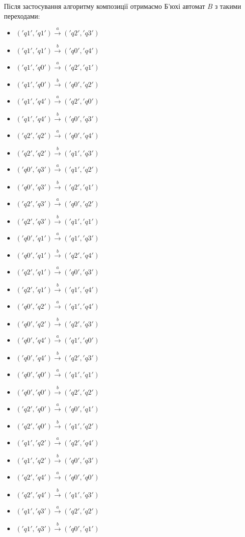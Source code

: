 \documentclass[12pt,a4paper]{article}
\begin{document}
Після застосування алгоритму композиції отримаємо Б'юхі автомат \(B\) з такими переходами:
\begin{itemize}
    \item \(('q1', 'q1') \xrightarrow{a} ('q2', 'q3')\)
    \item \(('q1', 'q1') \xrightarrow{b} ('q0', 'q4')\)
    \item \(('q1', 'q0') \xrightarrow{a} ('q2', 'q1')\)
    \item \(('q1', 'q0') \xrightarrow{b} ('q0', 'q2')\)
    \item \(('q1', 'q4') \xrightarrow{a} ('q2', 'q0')\)
    \item \(('q1', 'q4') \xrightarrow{b} ('q0', 'q3')\)
    \item \(('q2', 'q2') \xrightarrow{a} ('q0', 'q4')\)
    \item \(('q2', 'q2') \xrightarrow{b} ('q1', 'q3')\)
    \item \(('q0', 'q3') \xrightarrow{a} ('q1', 'q2')\)
    \item \(('q0', 'q3') \xrightarrow{b} ('q2', 'q1')\)
    \item \(('q2', 'q3') \xrightarrow{a} ('q0', 'q2')\)
    \item \(('q2', 'q3') \xrightarrow{b} ('q1', 'q1')\)
    \item \(('q0', 'q1') \xrightarrow{a} ('q1', 'q3')\)
    \item \(('q0', 'q1') \xrightarrow{b} ('q2', 'q4')\)
    \item \(('q2', 'q1') \xrightarrow{a} ('q0', 'q3')\)
    \item \(('q2', 'q1') \xrightarrow{b} ('q1', 'q4')\)
    \item \(('q0', 'q2') \xrightarrow{a} ('q1', 'q4')\)
    \item \(('q0', 'q2') \xrightarrow{b} ('q2', 'q3')\)
    \item \(('q0', 'q4') \xrightarrow{a} ('q1', 'q0')\)
    \item \(('q0', 'q4') \xrightarrow{b} ('q2', 'q3')\)
    \item \(('q0', 'q0') \xrightarrow{a} ('q1', 'q1')\)
    \item \(('q0', 'q0') \xrightarrow{b} ('q2', 'q2')\)
    \item \(('q2', 'q0') \xrightarrow{a} ('q0', 'q1')\)
    \item \(('q2', 'q0') \xrightarrow{b} ('q1', 'q2')\)
    \item \(('q1', 'q2') \xrightarrow{a} ('q2', 'q4')\)
    \item \(('q1', 'q2') \xrightarrow{b} ('q0', 'q3')\)
    \item \(('q2', 'q4') \xrightarrow{a} ('q0', 'q0')\)
    \item \(('q2', 'q4') \xrightarrow{b} ('q1', 'q3')\)
    \item \(('q1', 'q3') \xrightarrow{a} ('q2', 'q2')\)
    \item \(('q1', 'q3') \xrightarrow{b} ('q0', 'q1')\)
\end{itemize}
\end{document}
